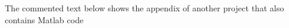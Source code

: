 


\begin{appendices}

The commented text below shows the appendix of another project that also contains Matlab code

%
%
%
%
%
%
%
%
%
%
%
%


\end{appendices}
